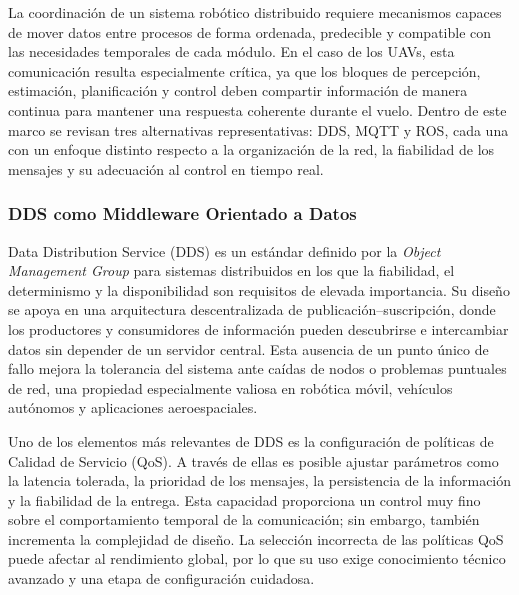 La coordinación de un sistema robótico distribuido requiere mecanismos capaces de mover datos entre procesos de forma ordenada, predecible y compatible con las necesidades temporales de cada módulo. En el caso de los UAVs, esta comunicación resulta especialmente crítica, ya que los bloques de percepción, estimación, planificación y control deben compartir información de manera continua para mantener una respuesta coherente durante el vuelo. Dentro de este marco se revisan tres alternativas representativas: DDS, MQTT y ROS, cada una con un enfoque distinto respecto a la organización de la red, la fiabilidad de los mensajes y su adecuación al control en tiempo real.

\vspace{0.3cm}

\subsubsection{DDS como Middleware Orientado a Datos}

Data Distribution Service (DDS) es un estándar definido por la \textit{Object Management Group} para sistemas distribuidos en los que la fiabilidad, el determinismo y la disponibilidad son requisitos de elevada importancia. Su diseño se apoya en una arquitectura descentralizada de publicación--suscripción, donde los productores y consumidores de información pueden descubrirse e intercambiar datos sin depender de un servidor central. Esta ausencia de un punto único de fallo mejora la tolerancia del sistema ante caídas de nodos o problemas puntuales de red, una propiedad especialmente valiosa en robótica móvil, vehículos autónomos y aplicaciones aeroespaciales.

\vspace{0.3cm}

Uno de los elementos más relevantes de DDS es la configuración de políticas de Calidad de Servicio (QoS). A través de ellas es posible ajustar parámetros como la latencia tolerada, la prioridad de los mensajes, la persistencia de la información y la fiabilidad de la entrega. Esta capacidad proporciona un control muy fino sobre el comportamiento temporal de la comunicación; sin embargo, también incrementa la complejidad de diseño. La selección incorrecta de las políticas QoS puede afectar al rendimiento global, por lo que su uso exige conocimiento técnico avanzado y una etapa de configuración cuidadosa.

\vspace{0.4cm}

